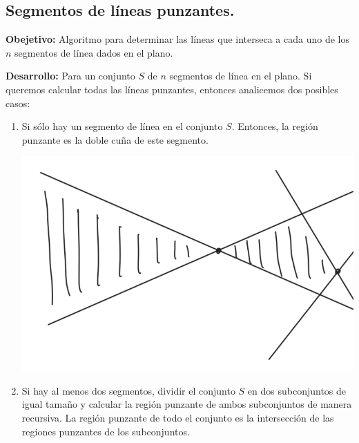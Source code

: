 \subsection[Expositor: Zayra Paulina Galván Ordoñez.]{Segmentos de líneas punzantes.}
\textbf{Obejetivo:} Algoritmo para determinar las líneas que interseca a cada uno de
los $n$ segmentos de línea dados en el plano.\newline

\textbf{Desarrollo:} Para un conjunto $S$ de $n$ segmentos de línea en el plano. Si queremos calcular
todas las líneas punzantes, entonces analicemos dos posibles casos:
\begin{enumerate}
\item Si sólo hay un segmento de línea en el conjunto $S$.
  Entonces, la región punzante es la doble cuña de este segmento.
  
  \begin{center}
    \includegraphics[scale=0.30]{./Im2.png}\\[0.4cm]
  \end{center}
\item Si hay al menos dos segmentos, dividir el conjunto $S$ en dos subconjuntos
  de igual tamaño y calcular la región punzante de ambos subconjuntos de manera
  recursiva. La región punzante de todo el conjunto es la intersección de las
  regiones punzantes de los subconjuntos.
\end{enumerate}
